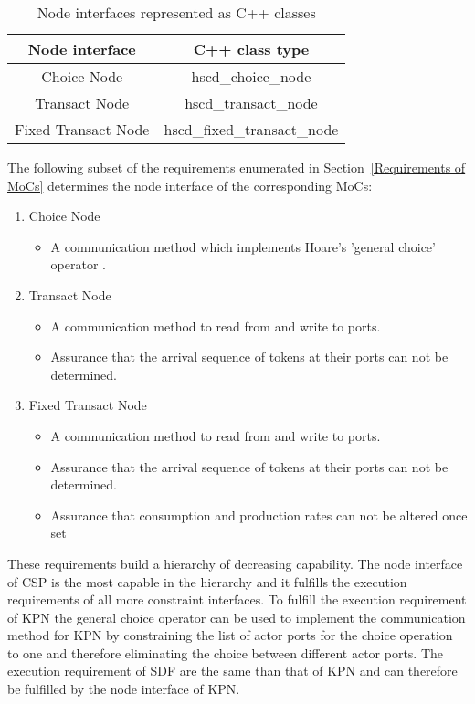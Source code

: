 \begin{table}
\centering
\begin{tabular}{|c|c|}
\hline
 Node interface & C++ class type \\
\hline \hline
 Choice Node          & hscd\_choice\_node \\
 Transact Node        & hscd\_transact\_node \\
 Fixed Transact Node  & hscd\_fixed\_transact\_node \\
\hline
\end{tabular}
\caption{\label{node-interface-c++}Node interfaces represented as C++ classes}
\end{table}

The following subset of the requirements enumerated in Section~\ref{Requirements of MoCs}
determines the node interface of the corresponding MoCs:

\begin{enumerate}
\item Choice Node
  \begin{itemize}
  \item  A communication method which implements Hoare's 'general choice' operator \cite{csphoare:1985}.
  \end  {itemize}
\item Transact Node
  \begin{itemize}
  \item A communication method to read from and write to ports.
  \item Assurance that the arrival sequence of tokens at
        their ports can not be determined.
  \end  {itemize}
\item Fixed Transact Node
  \begin{itemize}
  \item A communication method to read from and write to ports.
  \item Assurance that the arrival sequence of tokens at
        their ports can not be determined.
  \item Assurance that consumption and production rates can not
        be altered once set
  \end  {itemize}
\end{enumerate}

These requirements build a hierarchy of decreasing capability. The node
interface of CSP is the most capable in the hierarchy and it
fulfills the execution requirements of all more constraint interfaces.
To fulfill the execution requirement of KPN the general choice operator
can be used to implement the communication method for KPN by constraining
the list of actor ports for the choice operation to one and therefore
eliminating the choice between different actor ports.
The execution requirement of SDF are the same than that of KPN and can
therefore be fulfilled by the node interface of KPN.

